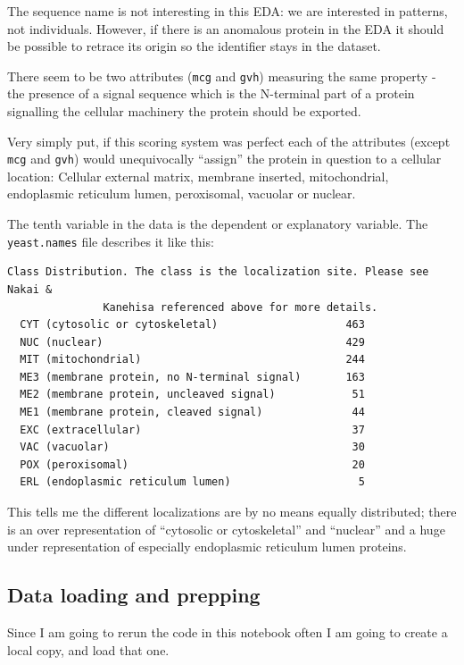 \documentclass[]{book}
\begin{document}
The sequence name is not interesting in this EDA: we are interested in patterns, not individuals. However, if there is an anomalous protein in the EDA it should be possible to retrace its origin so the identifier stays in the dataset.

There seem to be two attributes (\texttt{mcg} and \texttt{gvh}) measuring the same property - the presence of a signal sequence which is the N-terminal part of a protein signalling the cellular machinery the protein should be exported.

Very simply put, if this scoring system was perfect each of the attributes (except \texttt{mcg} and \texttt{gvh}) would unequivocally ``assign'' the protein in question to a cellular location: Cellular external matrix, membrane inserted, mitochondrial, endoplasmic reticulum lumen, peroxisomal, vacuolar or nuclear.

The tenth variable in the data is the dependent or explanatory variable. The \texttt{yeast.names} file describes it like this:

\begin{verbatim}
Class Distribution. The class is the localization site. Please see Nakai &
               Kanehisa referenced above for more details.
  CYT (cytosolic or cytoskeletal)                    463
  NUC (nuclear)                                      429
  MIT (mitochondrial)                                244
  ME3 (membrane protein, no N-terminal signal)       163
  ME2 (membrane protein, uncleaved signal)            51
  ME1 (membrane protein, cleaved signal)              44
  EXC (extracellular)                                 37
  VAC (vacuolar)                                      30
  POX (peroxisomal)                                   20
  ERL (endoplasmic reticulum lumen)                    5
\end{verbatim}

This tells me the different localizations are by no means equally distributed; there is an over representation of ``cytosolic or cytoskeletal'' and ``nuclear'' and a huge under representation of especially endoplasmic reticulum lumen proteins.

\hypertarget{data-loading-and-prepping}{%
\subsection{Data loading and prepping}\label{data-loading-and-prepping}}

Since I am going to rerun the code in this notebook often I am going to create a local copy, and load that one.
\end{document}
